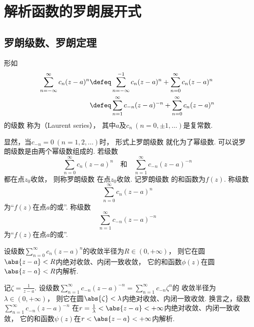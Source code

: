 \section{解析函数的罗朗展开式}
\subsection{罗朗级数、罗朗定理}
\begin{definition}
形如\begin{equation}\label{equation:解析函数的级数表示.罗朗级数}
\begin{split}
	\sum_{n=-\infty}^\infty c_n (z-a)^n
	&\defeq \sum_{n=-\infty}^{-1} c_n (z-a)^n + \sum_{n=0}^\infty c_n (z-a)^n \\
	&\defeq \sum_{n=1}^\infty c_{-n} (z-a)^{-n} + \sum_{n=0}^\infty c_n (z-a)^n
\end{split}
\end{equation}的级数
称为（Laurent series），
其中\(a\)及\(c_n\ (n=0,\pm1,\dotsc)\)是复常数.
\end{definition}
显然，当\(c_{-n}=0\ (n=1,2,\dotsc)\)时，
形式上罗朗级数  就化为了幂级数.
可以说罗朗级数是由两个幂级数组成的.
若级数\[
	\sum_{n=0}^\infty c_n (z-a)^n
	\quad\text{和}\quad
	\sum_{n=1}^\infty c_{-n} (z-a)^{-n}
\]都在点\(z_0\)收敛，
则称罗朗级数  在点\(z_0\)收敛.
记罗朗级数  的和函数为\(f(z)\).
称级数\[
	\sum_{n=0}^\infty c_n (z-a)^n
\]为“\(f(z)\)在点\(a\)的或”.
称级数\[
	\sum_{n=1}^\infty c_{-n} (z-a)^{-n}
\]为“\(f(z)\)在点\(a\)的或”.

设级数\(\sum_{n=0}^\infty c_n (z-a)^n\)的收敛半径为\(R \in (0,+\infty)\)，
则它在圆\(\abs{z-a}<R\)内绝对收敛、内闭一致收敛，
它的和函数\(\phi(z)\)在圆\(\abs{z-a}<R\)内解析.

记\(\zeta = \frac{1}{z-a}\).
设级数\(\sum_{n=1}^\infty c_{-n} (z-a)^{-n} = \sum_{n=1}^\infty c_{-n} \zeta^n\)的
收敛半径为\(\lambda \in (0,+\infty)\)，
则它在圆\(\abs{\zeta} < \lambda\)内绝对收敛、内闭一致收敛.
换言之，级数\(\sum_{n=1}^\infty c_{-n} (z-a)^{-n}\)
在\(r = \frac{1}{\lambda} < \abs{z-a} < +\infty\)内绝对收敛、内闭一致收敛，
它的和函数\(\psi(z)\)在\(r < \abs{z-a} < +\infty\)内解析.

